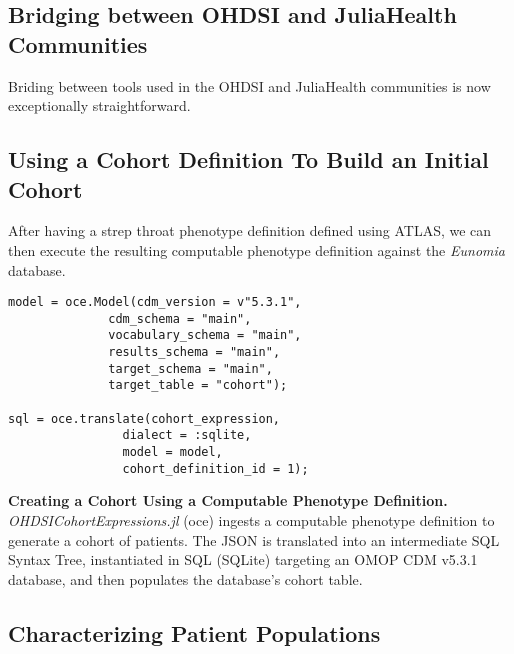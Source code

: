 \documentclass{juliacon}
\begin{document}
\subsection{Bridging between OHDSI and JuliaHealth Communities}

Briding between tools used in the OHDSI and JuliaHealth communities is now exceptionally straightforward.


\subsection{Using a Cohort Definition To Build an Initial Cohort}

After having a strep throat phenotype definition defined using ATLAS, we can then execute the resulting computable phenotype definition against the \textit{Eunomia} database.

\begin{listing}[!ht]
\begin{verbatim}
model = oce.Model(cdm_version = v"5.3.1", 
              cdm_schema = "main",
              vocabulary_schema = "main", 
              results_schema = "main",
              target_schema = "main", 
              target_table = "cohort");

sql = oce.translate(cohort_expression, 
                dialect = :sqlite, 
                model = model, 
                cohort_definition_id = 1);
\end{verbatim}
\caption{\textbf{Creating a Cohort Using a Computable Phenotype Definition.} \textit{OHDSICohortExpressions.jl} (oce) ingests a computable phenotype definition to generate a cohort of patients. The JSON is translated into an intermediate SQL Syntax Tree, instantiated in SQL (SQLite) targeting an OMOP CDM v5.3.1 database, and then populates the database's cohort table.}
\label{listing:cohort_creation}
\end{listing}

\subsection{Characterizing Patient Populations}
\end{document}
